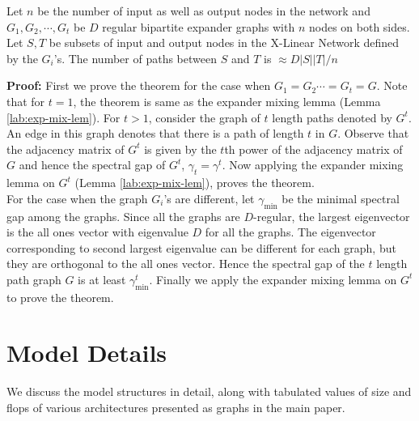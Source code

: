 \begin{theorem}
Let $n$ be the number of input as well as output nodes in the network and $G_1,G_2,\cdots, G_t$ be $D$ regular bipartite expander graphs with $n$ nodes on both sides. Let $S,T$ be subsets of input and output nodes in the X-Linear Network defined by the $G_i$'s. The number of paths between $S$ and $T$ is $\approx D|S||T|/n$
\end{theorem}
{\bf Proof:} First we prove the theorem for the case when $G_1 = G_2 \cdots = G_t = G$. Note that for $t=1$, the theorem is same as the expander mixing lemma (Lemma \ref{lab:exp-mix-lem}). For $t>1$, consider the graph of $t$ length paths denoted by $G^t$. An edge in this graph denotes that there is a path of length $t$ in $G$. Observe that the adjacency matrix of $G^t$ is given by the $t$th power of the adjacency matrix of $G$ and hence the spectral gap of $G^t$, $\gamma_t = \gamma^t$. Now applying the expander mixing lemma on $G^t$ (Lemma \ref{lab:exp-mix-lem}), proves the theorem.\\

\noindent For the case when the graph $G_i$'s are different, let $\gamma_{\min}$ be the minimal spectral gap among the graphs. Since all the graphs are $D$-regular, the largest eigenvector is the all ones vector with eigenvalue $D$ for all the graphs. The eigenvector corresponding to second largest eigenvalue can be different for each graph, but they are orthogonal to the all ones vector. Hence the spectral gap of the $t$ length path graph $G$ is at least $\gamma_{\min}^t$. Finally we apply the expander mixing lemma on $G^t$ to prove the theorem.



\section{Model Details}

\noindent We discuss the model structures in detail, along with tabulated  values of size and flops of various architectures presented as graphs in the main paper. 

